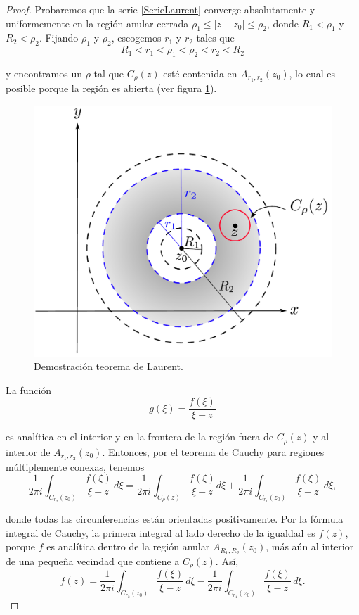 \begin{proof}

Probaremos que la serie \eqref{SerieLaurent} converge absolutamente y uniformemente en la región anular cerrada $\rho_1 \leq |z-z_0| \leq \rho_2$, donde $R_1 < \rho_1$ y $R_2 < \rho_2$. Fijando $\rho_1$ y $\rho_2$, escogemos $r_1$ y $r_2$ tales que
$$R_1 < r_1 < \rho_1 < \rho_2 < r_2 < R_2$$

y encontramos un $\rho$ tal que $C_{\rho}(z)$ esté contenida en $A_{r_1, r_2}(z_0)$, lo cual es posible porque la región es abierta (ver figura \ref{fig:TeoLaurent}).

\begin{figure}[H]
    \centering
    \includegraphics[scale = 0.5]{Figuras/TeoremaLaurent.pdf}
    \caption{Demostración teorema de Laurent.}
    \label{fig:TeoLaurent}
\end{figure}

La función
$$g(\xi) = \frac{f(\xi)}{\xi - z}$$

es analítica en el interior y en la frontera de la región fuera de $C_{\rho}(z)$ y al interior de $A_{r_1,r_2}(z_0)$. Entonces, por el teorema de Cauchy para regiones múltiplemente conexas, tenemos 
$$\frac{1}{2\pi i} \int_{C_{r_2}(z_0)} \frac{f(\xi)}{\xi -z} \,d\xi = \frac{1}{2\pi i} \int_{C_{\rho}(z)} \frac{f(\xi)}{\xi-z} d\xi + \frac{1}{2\pi i} \int_{C_{r_1}(z_0)} \frac{f(\xi)}{\xi - z} \,d\xi,$$

donde todas las circunferencias están orientadas positivamente. Por la fórmula integral de Cauchy, la primera integral al lado derecho de la igualdad es $f(z)$, porque $f$ es analítica dentro de la región anular $A_{R_1,R_2}(z_0)$, más aún al interior de una pequeña vecindad que contiene a $C_{\rho}(z)$. Así,
\begin{equation}
 f(z) = \frac{1}{2\pi i} \int_{C_{r_2}(z_0)} \frac{f(\xi)}{\xi - z} \,d\xi - \frac{1}{2\pi i}  \int_{C_{r_1}(z_0)} \frac{f(\xi)}{\xi - z} \,d\xi. \label{DemLaurent1}
\end{equation}


\end{proof}
